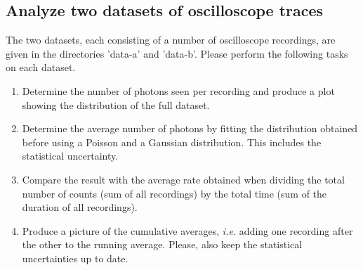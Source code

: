 \documentclass[10pt,aps,twocolumn,secnumarabic,balancelastpage,amsmath,amssymb,nofootinbib,floatfix]{revtex4}
\begin{document}
\subsection{Analyze two datasets of oscilloscope traces}

The two datasets, each consisting of a number of oscilloscope recordings, are given in the directories 'data-a' and 'data-b'. Please perform the following tasks on each dataset.
\begin{enumerate}
\item Determine the number of photons seen per recording and produce a plot showing the distribution of the full dataset.
\item Determine the average number of photons by fitting the distribution obtained before using a Poisson and a Gaussian distribution. This includes the statistical uncertainty.
\item Compare the result with the average rate obtained when dividing the total number of counts (sum of all recordings) by the total time (sum of the duration of all recordings).
\item Produce a picture of the cumulative averages, {\it i.e.} adding one recording after the other to the running average. Please, also keep the statistical uncertainties up to date.
\end{enumerate}



%
%
\end{document}
